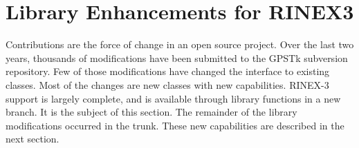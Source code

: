 \section*{Library Enhancements for RINEX3}

Contributions are the force of change in an open source
project.  Over the last two years, thousands of modifications have
been submitted to the GPSTk subversion repository. Few of those
modifications have changed the interface to existing classes. Most of
the changes are new classes with new capabilities.
\mbox{RINEX-3} support is largely complete, and is
available through library functions in a new branch. It is the subject of
this section. The remainder of
the library modifications occurred in the trunk. These new
capabilities are described in the next section. 

